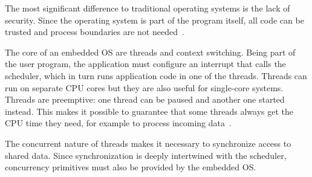 The most significant difference to traditional operating systems is the lack of security. Since the
operating system is part of the program itself, all code can be trusted and process boundaries are
not needed~\cite{modern-os-embedded-os}.

The core of an embedded OS are threads and context switching. Being part of the user program, the
application must configure an interrupt that calls the scheduler, which in turn runs application
code in one of the threads. Threads can run on separate CPU cores but they are also useful for single-core
systems. Threads are preemptive: one thread can be paused and another one started instead. This
makes it possible to guarantee that some threads always get the CPU time they need, for example to
process incoming data~\cite{freertos-fundamentals}.

The concurrent nature of threads makes it necessary to synchronize access to shared data. Since
synchronization is deeply intertwined with the scheduler, concurrency primitives must also be
provided by the embedded OS.
